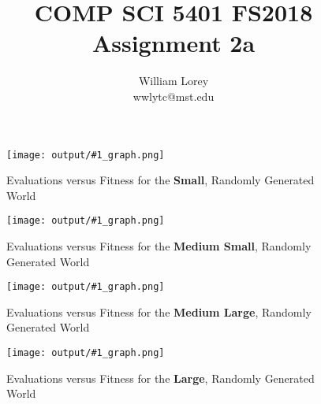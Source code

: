 \documentclass[11pt]{article}
\title{COMP SCI 5401 FS2018 Assignment 2a}
\author{William  Lorey \\ wwlytc@mst.edu}
\date{}
\newcommand{\fitnessplotcaption}[1]{\caption{Evaluations versus Fitness for the \textbf{{#1}}, Randomly Generated World}}
\newcommand{\addgraphic}[1]{\centerline{\texttt{[image: output/\#1\_graph.png]}}}
\begin{document}
\maketitle

\begin{figure}[H]
    \addgraphic{small}
    \fitnessplotcaption{Small}
    \label{fig:small}
\end{figure}

\begin{figure}[H]
    \addgraphic{med_small}
    \fitnessplotcaption{Medium Small}
    \label{fig:med_small}
\end{figure}

\begin{figure}[H]
    \addgraphic{med_large}
    \fitnessplotcaption{Medium Large}
    \label{fig:med_large}
\end{figure}

\begin{figure}[H]
    \addgraphic{large}
    \fitnessplotcaption{Large}
    \label{fig:large}
\end{figure}
\end{document}
